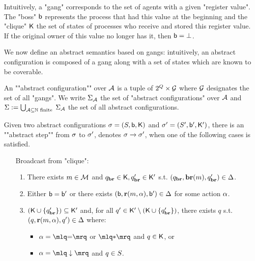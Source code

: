 Intuitively, a "gang" corresponds to the set of agents with a given "register value". The "boss" $\mathsf{b}$ represents the process that had this value at the beginning and the "clique" $\mathsf{K}$ the set of states of processes who receive and stored this register value. If the original owner of this value no longer has it, then $\mathsf{b} = \bot$.

We now define an abstract semantics based on gangs: intuitively, an abstract configuration is composed of a gang along with a set of states which are known to be coverable.

\begin{definition}
\label{def:abstract-configuration}
An ""abstract configuration"" over $\mathcal{A}$ is a tuple of $2^Q \times \mathcal{G}$ where $\mathcal{G}$ designates the set of all "gangs". We write $\Sigma_{\mathcal{A}}$ the set of "abstract configurations" over $\mathcal{A}$ and $\Sigma := \bigcup_{\mathcal{A} \subseteq \mathbb{N} \text{ finite }}\Sigma_{\mathcal{A}}$ the set of all abstract configurations. 

Given two abstract configurations $\sigma = (S, \mathsf{b}, \mathsf{K})$ and $\sigma' = (S', \mathsf{b}', \mathsf{K}')$, there is an ""abstract step"" from $\sigma$ to $\sigma'$, denotes $\sigma \xrightarrow{} \sigma'$, when one of the following cases is satisfied.
\begin{enumerate}
\item[Broadcast from "clique":] 
	\begin{enumerate}[label=(\roman*)]
		\item\label{item:broadcast_from_clique_broadcast} There exists $m \in \mathcal{M}$ and $q_{\textbf{br}} \in \mathsf{K}, q_{\textbf{br}}' \in \mathsf{K}'$ s.t. $(q_{\textbf{br}}, \textbf{br}(m), q_{\textbf{br}}') \in \Delta$. 
		
		\item\label{item:broadcast_from_clique_boss} Either $\mathsf{b} = \mathsf{b}'$ or there exists $(\mathsf{b}, \textbf{r}(m, \alpha), \mathsf{b}') \in \Delta$ for some action $\alpha$.

		\item\label{item:broadcast_from_clique_clique}$(\mathsf{K} \cup \{q_{\textbf{br}}'\}) \subseteq \mathsf{K}'$ and, for all $q' \in \mathsf{K}' \setminus (\mathsf{K} \cup \{q_{\textbf{br}}'\})$, there exists $q$ s.t. $(q, \textbf{r}(m, \alpha), q') \in \Delta$ where:
		\begin{itemize}
			\item $\anact = \quotemarks{\eqtestact}$ or $\quotemarks{\dummyact}$ and $q \in \mathsf{K}$, or
			\item $\anact= \quotemarks{\enregact}$ and $q \in S$.
		\end{itemize}
		

\end{enumerate}
\end{enumerate}
\end{definition}
